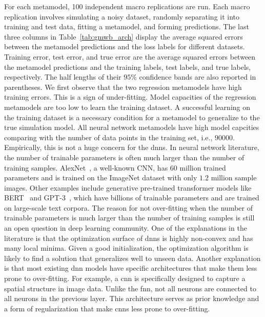 For each metamodel, \num{100} independent macro replications are run.
Each macro replication involves simulating a noisy dataset, randomly separating it into training and test data, fitting a metamodel, and forming predictions.
The last three columns in Table~\ref{tab:gmwb_arch} display the average squared errors between the metamodel predictions and the loss labels for different datasets.
Training error, test error, and true error are the average squared errors between the metamodel predictions and the training labels, test labels, and true labels, respectively.
The half lengths of their $95\%$ confidence bands are also reported in parentheses.
We first observe that the two regression metamodels have high training errors.
This is a sign of under-fitting.
Model capacities of the regression metamodels are too low to learn the training dataset.
A successful learning on the training dataset is a necessary condition for a metamodel to generalize to the true simulation model.
All neural network metamodels have high model capcities comparing with the number of data points in the training set, i.e., $\num{90000}$.
Empirically, this is not a huge concern for the \gls{dnn}s.
In neural network literature, the number of trainable parameters is often much larger than the number of training samples.
AlexNet~\citep{krizhevsky2012imagenet}, a well-known CNN, has $\num{60}$ million trained parameters and is trained on the ImageNet dataset with only $1.2$ million sample images.
Other examples include generative pre-trained transformer models like BERT~\citep{devlin2018bert} and GPT-3~\citep{brown2020language}, which have billions of trainable parameters and are trained on large-scale text corpora.
The reason for not over-fitting when the number of trainable parameters is much larger than the number of training samples is still an open question in deep learning community.
One of the explanations in the literature is that the optimization surface of \gls{dnn}s is highly non-convex and has many local minima.
Given a good initialization, the optimization algorithm is likely to find a solution that generalizes well to unseen data.
Another explanation is that most existing \gls{dnn} models have specific architectures that make them less prone to over-fitting.
For example, a \gls{cnn} is specifically designed to capture a spatial structure in image data.
Unlike the \gls{fnn}, not all neurons are connected to all neurons in the previous layer.
This architecture serves as prior knowledge and a form of regularization that make \gls{cnn}s less prone to over-fitting.

